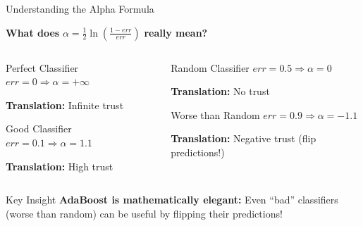 \documentclass[9pt]{beamer}
\begin{document}
\begin{frame}{Understanding the Alpha Formula}
\begin{keypointsbox}
\textbf{What does } $\alpha = \frac{1}{2}\ln\left(\frac{1-err}{err}\right)$ \textbf{ really mean?}
\end{keypointsbox}

\begin{columns}
\begin{column}{0.5\textwidth}
\begin{definitionbox}{Perfect Classifier}
$err = 0 \Rightarrow \alpha = +\infty$

\textbf{Translation:} Infinite trust
\end{definitionbox}

\begin{examplebox}{Good Classifier}
$err = 0.1 \Rightarrow \alpha = 1.1$

\textbf{Translation:} High trust
\end{examplebox}
\end{column}

\begin{column}{0.5\textwidth}
\begin{alertbox}{Random Classifier}
$err = 0.5 \Rightarrow \alpha = 0$

\textbf{Translation:} No trust
\end{alertbox}

\begin{alertbox}{Worse than Random}
$err = 0.9 \Rightarrow \alpha = -1.1$

\textbf{Translation:} Negative trust (flip predictions!)
\end{alertbox}
\end{column}
\end{columns}

\begin{examplebox}{Key Insight}
\textbf{AdaBoost is mathematically elegant:} Even ``bad'' classifiers (worse than random) can be useful by flipping their predictions!
\end{examplebox}
\end{frame}
\end{document}
